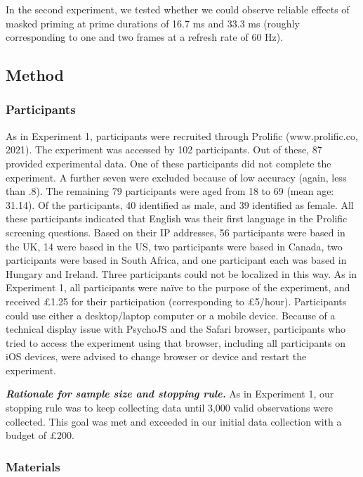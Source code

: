 \documentclass[
  english,
  man,floatsintext]{apa6}
\begin{document}
In the second experiment, we tested whether we could observe reliable effects of masked priming at prime durations of 16.7 ms and 33.3 ms (roughly corresponding to one and two frames at a refresh rate of 60 Hz).

\hypertarget{method-1}{%
\subsection{Method}\label{method-1}}

\hypertarget{participants-1}{%
\subsubsection{Participants}\label{participants-1}}

As in Experiment 1, participants were recruited through Prolific (www.prolific.co, 2021). The experiment was accessed by 102 participants. Out of these, 87 provided experimental data. One of these participants did not complete the experiment. A further seven were excluded because of low accuracy (again, less than .8). The remaining 79 participants were aged from 18 to 69 (mean age: 31.14). Of the participants, 40 identified as male, and 39 identified as female. All these participants indicated that English was their first language in the Prolific screening questions. Based on their IP addresses, 56 participants were based in the UK, 14 were based in the US, two participants were based in Canada, two participants were based in South Africa, and one participant each was based in Hungary and Ireland. Three participants could not be localized in this way. As in Experiment 1, all participants were naïve to the purpose of the experiment, and received £1.25 for their participation (corresponding to £5/hour). Participants could use either a desktop/laptop computer or a mobile device. Because of a technical display issue with PsychoJS and the Safari browser, participants who tried to access the experiment using that browser, including all participants on iOS devices, were advised to change browser or device and restart the experiment.

\textbf{\emph{Rationale for sample size and stopping rule.}} As in Experiment 1, our stopping rule was to keep collecting data until 3,000 valid observations were collected. This goal was met and exceeded in our initial data collection with a budget of £200.

\hypertarget{materials-1}{%
\subsubsection{Materials}\label{materials-1}}
\end{document}
